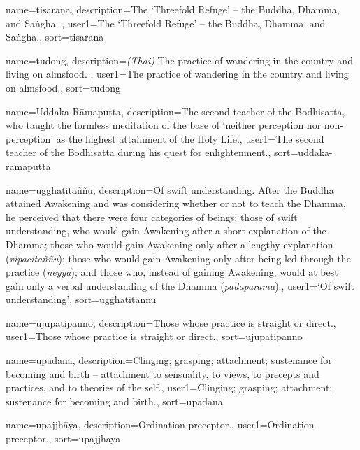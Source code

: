 {
name={tisara\d{n}a},
description={The `Threefold Refuge' -- the Buddha, Dhamma, and Sa\.ngha. \protect \seepre %
\protect {}%
\protect \seepost %
},
user1={The `Threefold Refuge' -- the Buddha, Dhamma, and Sa\.ngha.},
sort={tisarana}
}

{
name=tudong,
description={\textit{(Thai)} The practice of wandering in the country and living on almsfood. \protect \seepre %
\protect {}%
\protect \seepost %
},
user1={The practice of wandering in the country and living on almsfood.},
sort={tudong}
}

{
name={Uddaka R\=amaputta},
description={The second teacher of the Bodhisatta, who taught the formless meditation of the base of `neither perception nor non-perception' as the highest attainment of the Holy Life.},
user1={The second teacher of the Bodhisatta during his quest for enlightenment.},
sort={uddaka-ramaputta}
}

{
name={uggha\d{t}ita\~n\~nu},
description={Of swift understanding. After the Buddha attained Awakening and was considering whether or not to teach the Dhamma, he perceived that there were four categories of beings: those of swift understanding, who would gain Awakening after a short explanation of the Dhamma; those who would gain Awakening only after a lengthy explanation (\textit{vipacita\~n\~nu}); those who would gain Awakening only after being led through the practice (\textit{neyya}); and those who, instead of gaining Awakening, would at best gain only a verbal understanding of the Dhamma (\textit{padaparama}).},
user1={`Of swift understanding'},
sort={ugghatitannu}
}

{
name=ujupa\d{t}ipanno,
description={Those whose practice is straight or direct.},
user1={Those whose practice is straight or direct.},
sort={ujupatipanno}
}

{
name={up\=ad\=ana},
description={Clinging; grasping; attachment; sustenance for becoming and birth -- attachment to sensuality, to views, to precepts and practices, and to theories of the self.},
user1={Clinging; grasping; attachment; sustenance for becoming and birth.},
sort={upadana}
}

{
name=upajjh\=aya,
description={Ordination preceptor.},
user1={Ordination preceptor.},
sort={upajjhaya}
}

